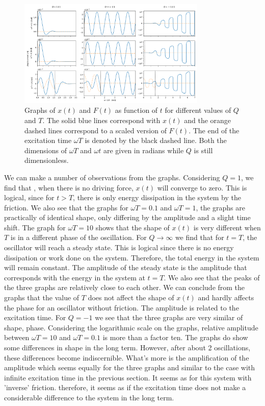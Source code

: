 \begin{figure}[h!]
	\centering
	\includegraphics[width=0.8\textwidth]{figures/graph_q2.png}
	\caption{Graphs of $x(t)$ and $F(t)$  as function of $t$ for different values of $Q$ and $T$. The solid blue lines correspond with $x(t)$ and the orange dashed lines correspond to a scaled version of $F(t)$. The end of the excitation time $\omega T$ is denoted by the black dashed line. Both the dimensions of $\omega T$ and $\omega t$ are given in radians while $Q$ is still dimensionless.}
	\label{fig_q1}
\end{figure}

We can make a number of observations from the graphs. Considering $Q = 1$, we find that , when there is no driving force, $x(t)$ will converge to zero. This is logical, since for $t>T$, there is only energy dissipation in the system by the friction. We also see that the graphs for $\omega T = 0.1$ and $\omega T =1$, the graphs are practically of identical shape, only differing by the amplitude and a slight time shift. The graph for $\omega T = 10$ shows that the shape of $x(t)$ is very different when $T$ is in a different phase of the oscillation.
For $Q \rightarrow \infty$ we find that for $t=T$, the oscillator will reach a steady state. This is logical since there is no energy dissipation or work done on the system. Therefore, the total energy in the system will remain constant. The amplitude of the steady state is the amplitude that corresponds with the energy in the system at $t=T$. We also see that the peaks of the three graphs are relatively close to each other. We can conclude from the graphs that the value of $T$ does not affect the shape of $x(t)$ and hardly affects the phase for an oscillator without friction. The amplitude is related to the excitation time.
For $Q=-1$ we see that the three graphs are very similar of shape, phase. Considering the logarithmic scale on the graphs, relative amplitude between $\omega T = 10$ and $\omega T = 0.1$ is more than a factor ten. The graphs do show some differences in shape in the long term. However, after about 2 oscillations, these differences become indiscernible. What's more is the amplification of the amplitude which seems equally for the three graphs and similar to the case with infinite excitation time in the previous section. It seems as for this system with 'inverse' friction. therefore, it seems as if the excitation time does not make a considerable difference to the system in the long term.\\


